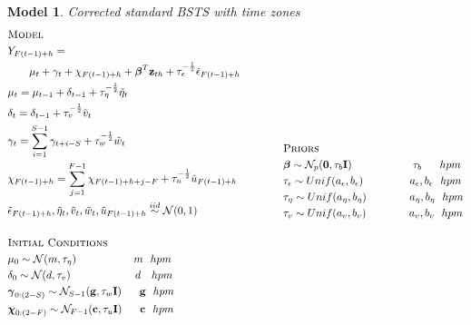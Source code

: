 \documentclass[11pt,twoside]{report}
\newtheorem{model}{Model}
\begin{document}
 \begin{model} Corrected standard BSTS with time zones
 	\begin{equation*}
 	\begin{aligned}
 	&\textsc{Model}\\
 	&Y_{F(t-1)+h} = \\&\quad\quad
 	\mu_{t} + \gamma_{t} + \chi_{F(t-1)+h} + \boldsymbol{\beta}^T\mathbf{z}_{th} + \tau_\epsilon^{-\frac{1}{2}}\tilde{\epsilon}_{F(t-1)+h}\\
 	&\mu_t = \mu_{t-1} + \delta_{t-1} +\tau_\eta^{-\frac{1}{2}}\tilde{\eta}_t\\
 	&\delta_t = \delta_{t-1} + \tau_v^{-\frac{1}{2}}\tilde{v}_t\\
 	&\gamma_t = \sum_{i=1}^{S-1}\gamma_{t+i-S} + \tau_w^{-\frac{1}{2}}\tilde{w}_t\\
 	&\chi_{F(t-1)+h} = \sum_{j=1}^{F-1}\chi_{F(t-1)+h+j-F} + \tau_u^{-\frac{1}{2}}\tilde{u}_{F(t-1)+h}\\
 	&\tilde{\epsilon}_{F(t-1)+h}, \tilde{\eta}_t, \tilde{v}_t, \tilde{w}_t, \tilde{u}_{F(t-1)+h} \overset{iid}{\sim} \mathcal{N}(0,1)\\
 	\\
 	&\textsc{Initial Conditions}\\
 	&\mu_0 \sim \mathcal{N}(m, \tau_\eta)\quad \quad \quad \quad \quad\  m\ \ hpm\\
 	&\delta_0 \sim \mathcal{N}(d, \tau_v)\quad \quad \quad \quad \quad \quad d\ \ \ hpm\\
 	&\boldsymbol{\gamma}_{0:(2-S)} \sim \mathcal{N}_{S-1}(\mathbf{g}, \tau_w\mathbf{I})\quad\ \ \mathbf{g}\ \ hpm\\
 	&\boldsymbol{\chi}_{0:(2-F)} \sim \mathcal{N}_{F-1}(\mathbf{c}, \tau_u\mathbf{I})\quad\ \  \mathbf{c}\ \ hpm\\
 	\\
 	\end{aligned}
 	\qquad \qquad
 	\begin{aligned}[c]
 	&\textsc{Priors}\\
 	&\boldsymbol{\beta} \sim \mathcal{N}_p(\mathbf{0}, \tau_b \mathbf{I})\ \ \quad \quad \quad \quad \quad \tau_b\ \quad \ hpm\\
 	&\tau_\epsilon \sim Unif(a_\epsilon, b_\epsilon)\quad\quad\ \quad \quad a_\epsilon, b_\epsilon\ \ hpm\\
 	&\tau_\eta \sim Unif(a_\eta, b_\eta)\quad\quad\quad \quad a_\eta, b_\eta\ \ hpm\\
 	&\tau_v \sim Unif(a_v, b_v)\quad\quad\quad \quad a_v, b_v\ \ hpm\\

\end{aligned}
\end{equation*}
\end{model}
\end{document}
